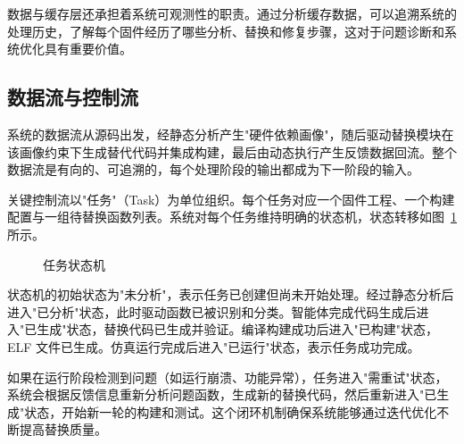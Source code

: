 数据与缓存层还承担着系统可观测性的职责。通过分析缓存数据，可以追溯系统的处理历史，了解每个固件经历了哪些分析、替换和修复步骤，这对于问题诊断和系统优化具有重要价值。

\subsection{数据流与控制流}

系统的数据流从源码出发，经静态分析产生"硬件依赖画像"，随后驱动替换模块在该画像约束下生成替代代码并集成构建，最后由动态执行产生反馈数据回流。整个数据流是有向的、可追溯的，每个处理阶段的输出都成为下一阶段的输入。

关键控制流以"任务"（Task）为单位组织。每个任务对应一个固件工程、一个构建配置与一组待替换函数列表。系统对每个任务维持明确的状态机，状态转移如图~\ref{fig:state-machine}所示。

\begin{figure}[htbp]
\centering
{}
\caption{任务状态机}
\label{fig:state-machine}
\end{figure}

状态机的初始状态为"未分析"，表示任务已创建但尚未开始处理。经过静态分析后进入"已分析"状态，此时驱动函数已被识别和分类。智能体完成代码生成后进入"已生成"状态，替换代码已生成并验证。编译构建成功后进入"已构建"状态，ELF 文件已生成。仿真运行完成后进入"已运行"状态，表示任务成功完成。

如果在运行阶段检测到问题（如运行崩溃、功能异常），任务进入"需重试"状态，系统会根据反馈信息重新分析问题函数，生成新的替换代码，然后重新进入"已生成"状态，开始新一轮的构建和测试。这个闭环机制确保系统能够通过迭代优化不断提高替换质量。

